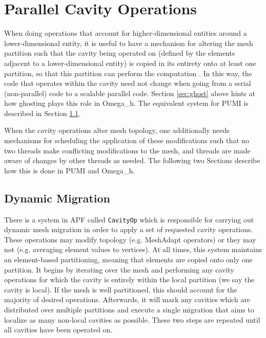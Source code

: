 \section{Parallel Cavity Operations}
\label{sec:cavity_sched}

When doing operations that account for higher-dimensional entities
around a lower-dimensional entity, it is useful to have a mechanism
for altering the mesh partition such that the cavity being operated
on (defined by the elements adjacent to a lower-dimensional entity)
is copied in its entirety onto at least one partition, so that this
partition can perform the computation \cite{de1999parallel}.
In this way, the code that operates within the cavity need not change
when going from a serial (non-parallel) code to a scalable parallel code.
Section \ref{sec:ghost} above hints at how ghosting plays this role
in Omega\_h.
The equivalent system for PUMI is described in Section \ref{sec:cavity_operator}.

When the cavity operations alter mesh topology, one additionally needs
mechanisms for scheduling the application of these modifications
such that no two threads make conflicting modifications to the mesh,
and threads are made aware of changes by other threads as needed.
The following two Sections describe how this is done in PUMI and Omega\_h.

\subsection{Dynamic Migration}
\label{sec:cavity_operator}

There is a system in APF called \texttt{CavityOp} which is responsible
for carrying out dynamic mesh migration in order to apply a set
of requested cavity operations.
These operations may modify topology (e.g. MeshAdapt operators)
or they may not (e.g. averaging element values to vertices).
At all times, this system maintains an element-based partitioning,
meaning that elements are copied onto only one partition.
It begins by iterating over the mesh and performing any
cavity operations for which the cavity is entirely within the
local partition (we say the cavity is local).
If the mesh is well partitioned, this should account for the majority
of desired operations.
Afterwards, it will mark any cavities which are distributed over
multiple partitions and execute a single migration that aims
to localize as many non-local cavities as possible.
These two steps are repeated until all cavities have been operated on.

